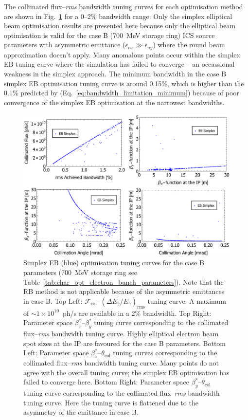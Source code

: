 \documentclass[../main.tex]{subfiles}
\begin{document}
The collimated flux--\textit{rms} bandwidth tuning curves for each optimisation method are shown in Fig.~\ref{fig:case_B_optimisation_comparison} for a 0--2\% bandwidth range. Only the simplex elliptical beam optimisation results are presented here because only the elliptical beam optimisation is valid for the case B (700~\si{\mega\electronvolt} storage ring) ICS source parameters with asymmetric emittance ($\epsilon_{nx} \gg \epsilon_{ny}$) where the round beam approximation doesn't apply. Many anomalous points occur within the simplex EB tuning curve where the simulation has failed to converge -- an occassional weakness in the simplex approach. The minimum bandwidth in the case B simplex EB optimisation tuning curve is around 0.15\%, which is higher than the 0.1\% predicted by (Eq.~\ref{eq:bandwidth_limitation_minimum}) because of poor convergence of the simplex EB optimisation at the narrowest bandwidths. 
\begin{figure}[!h]
\centering
\includegraphics[width=\textwidth]{Figures/Optimisation_and_Characterisation_of_Inverse_Compton_Scattering_Sources/CaseBoptcomp.pdf}
\caption{Simplex EB (blue) optimisation tuning curves for the case B parameters (700~\si{\mega\electronvolt} storage ring see Table~\ref{tab:char_opt_electron_bunch_parameters}). Note that the RB method is not applicable because of the asymmetric emittances in case B. Top Left: $\mathcal{F}_{\mathrm{col}}$--$\left(\Delta E_{\gamma}/E_{\gamma}\right)_{\mathrm{rms}}$ tuning curve. A maximum of $\sim1\times 10^{10}$~ph/\si{\second} are available in a 2\% bandwidth. Top Right: Parameter space $\beta_{x}^{*}$--$\beta_{y}^{*}$ tuning curve corresponding to the collimated flux--\textit{rms} bandwidth tuning curve. Highly elliptical electron beam spot sizes at the IP are favoured for the case B parameters. Bottom Left: Parameter space $\beta_{x}^{*}$--$\theta_{\mathrm{col}}$ tuning curves corresponding to the collimated flux--\textit{rms} bandwidth tuning curve. Many points do not agree with the overall tuning curve; the simplex EB optimisation has failed to converge here. Bottom Right: Parameter space $\beta_{y}^{*}$--$\theta_{\mathrm{col}}$ tuning curve corresponding to the collimated flux--\textit{rms} bandwidth tuning curve. Here the tuning curve is flattened due to the asymmetry of the emittance in case B.}
\label{fig:case_B_optimisation_comparison}
\end{figure}
\end{document}
